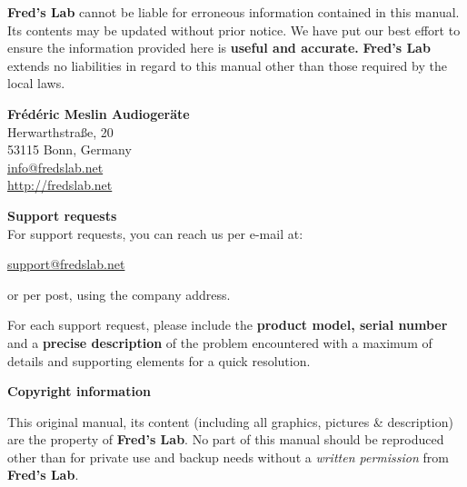\documentclass{scrartcl}
\begin{document}
\textbf{Fred's Lab} cannot be liable for erroneous information contained in this manual. Its contents may be updated without prior notice. We have put our best effort to ensure the information provided here is \textbf{useful and accurate.} \textbf{Fred's Lab} extends no liabilities in regard to this manual other than those required by the local laws.

\vspace{0.25cm}
\begin{center}
    \textbf{Frédéric Meslin Audiogeräte} \\
    Herwarthstraße, 20 \\
    53115 Bonn, Germany \\
    \url{info@fredslab.net} \\
    \url{http://fredslab.net} \\
\end{center}

\vspace{0.25cm}
\textbf{Support requests} \\
For support requests, you can reach us per e-mail at:
\begin{center}
    \url{support@fredslab.net}
\end{center}
or per post, using the company address.

For each support request, please include the \textbf{product model, serial number} and a \textbf{precise description} of the problem encountered with a maximum of details and supporting elements for a quick resolution.

\vspace{0.5cm}
\textbf{Copyright information}

This original manual, its content (including all graphics, pictures \& description) are the property of \textbf{Fred's Lab}. No part of this manual should be reproduced other than for private use and backup needs without a \emph{written permission} from \textbf{Fred's Lab}.

\pagebreak

\end{document}
